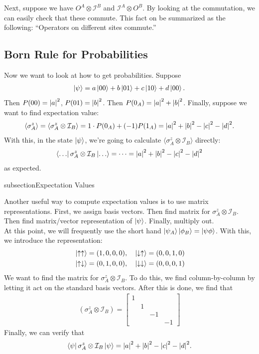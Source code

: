 \documentclass{book}
\theoremstyle{definition}
\newcommand{\nn}{\nonumber}
\newcommand{\Id}{\mathcal{I}}
\begin{document}
Next, suppose we have $O^A \otimes \Id^B$ and $\Id^A \otimes O^B$. By looking at the commutation, we can easily check that these commute. This fact on be summarized as the following: ``Operators on different sites commute.'' \\


\subsection{Born Rule for Probabilities}

Now we want to look at how to get probabilities. Suppose
\begin{align}
\ket{\psi} = a\ket{00} + b\ket{01} + c\ket{10} + d\ket{00}.
\end{align}
Then $P(00) = \abs{a}^2$, $P(01) = \abs{b}^2$. Then $P(0_A) = \abs{a}^2 + \abs{b}^2$. Finally, suppose we want to find expectation value:
\begin{align}
\langle \sigma^z_A \rangle = \langle \sigma^z_A \otimes \Id_B \rangle = 1\cdot P(0_A) + (-1)P(1_A) = \abs{a}^2 + \abs{b}^2 - \abs{c}^2 - \abs{d}^2.
\end{align}
With this, in the state $\ket{\psi}$, we're going to calculate $\langle \sigma^z_A \otimes \Id_B\rangle $ directly:
\begin{align}
\bra{\dots} \sigma^z_A \otimes \Id_B\ket{\dots} = \dots =  \abs{a}^2 + \abs{b}^2 - \abs{c}^2 - \abs{d}^2
\end{align}
as expected.



subsection{Expectation Values}

Another useful way to compute expectation values is to use matrix representations. First, we assign basis vectors. Then find matrix for $\sigma_A^z \otimes \Id_B$. Then find matrix/vector representation of $\ket{\psi}$. Finally, multiply out. \\

At this point, we will frequently use the short hand $\ket{\psi_A}\ket{\phi_B} = \ket{\psi\phi}$. With this, we introduce the representation:
\begin{align}
&\ket{\uparrow\uparrow} = (1,0,0,0), \quad \ket{\downarrow\uparrow} = (0,0,1,0)\nn\\
&\ket{\uparrow\downarrow} = (0,1,0,0), \quad \ket{\downarrow\downarrow} = (0,0,0,1)
\end{align}
We want to find the matrix for $\sigma^z_A \otimes  \Id_B$. To do this, we find column-by-column by letting it act on the standard basis vectors. After this is done, we find that 
\begin{align}
(\sigma_A^z \otimes \Id_B) = \begin{bmatrix}
1 &&&\\
& 1 && \\
&&-1&\\
&&&-1
\end{bmatrix}
\end{align}
Finally, we can verify that
\begin{align}
\bra{\psi} \sigma^z_A \otimes \Id_B \ket{\psi} = \abs{a}^2 + \abs{b}^2 - \abs{c}^2 - \abs{d}^2.
\end{align}
\end{document}
